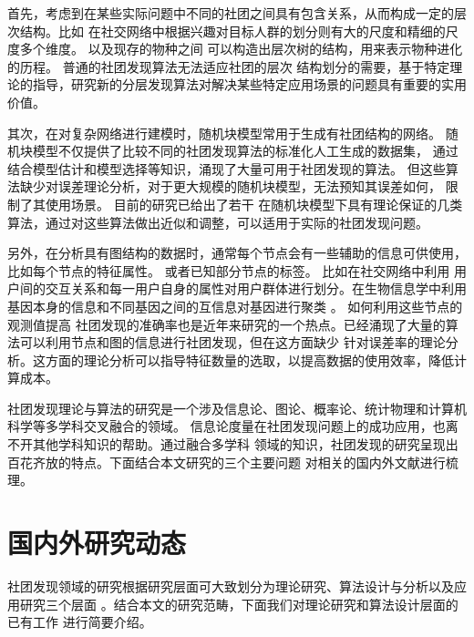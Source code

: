 


首先，考虑到在某些实际问题中不同的社团之间具有包含关系，从而构成一定的层次结构。比如
在社交网络中根据兴趣对目标人群的划分则有大的尺度和精细的尺度多个维度。
以及现存的物种之间
可以构造出层次树的结构，用来表示物种进化的历程。
普通的社团发现算法无法适应社团的层次
结构划分的需要，基于特定理论的指导，研究新的分层发现算法对解决某些特定应用场景的问题具有重要的实用价值。

其次，在对复杂网络进行建模时，随机块模型常用于生成有社团结构的网络。
随机块模型不仅提供了比较不同的社团发现算法的标准化人工生成的数据集，
通过结合模型估计和模型选择等知识，涌现了大量可用于社团发现的算法。
但这些算法缺少对误差理论分析，对于更大规模的随机块模型，无法预知其误差如何，
限制了其使用场景。
目前的研究已给出了若干
在随机块模型下具有理论保证的几类算法，通过对这些算法做出近似和调整，可以适用于实际的社团发现问题。

另外，在分析具有图结构的数据时，通常每个节点会有一些辅助的信息可供使用，比如每个节点的特征属性。
或者已知部分节点的标签。
比如在社交网络中利用
用户间的交互关系和每一用户自身的属性对用户群体进行划分。在生物信息学中利用
基因本身的信息和不同基因之间的互信息对基因进行聚类 \cite{4359897}。
如何利用这些节点的观测值提高
社团发现的准确率也是近年来研究的一个热点。已经涌现了大量的算法可以利用节点和图的信息进行社团发现，但在这方面缺少
针对误差率的理论分析。这方面的理论分析可以指导特征数量的选取，以提高数据的使用效率，降低计算成本。



社团发现理论与算法的研究是一个涉及信息论、图论、概率论、统计物理和计算机科学等多学科交叉融合的领域。
信息论度量在社团发现问题上的成功应用，也离不开其他学科知识的帮助。通过融合多学科
领域的知识，社团发现的研究呈现出百花齐放的特点。下面结合本文研究的三个主要问题
对相关的国内外文献进行梳理。

\section{国内外研究动态}

社团发现领域的研究根据研究层面可大致划分为理论研究、算法设计与分析以及应用研究三个层面
\cite{ZJSH201102017}。结合本文的研究范畴，下面我们对理论研究和算法设计层面的已有工作
进行简要介绍。

